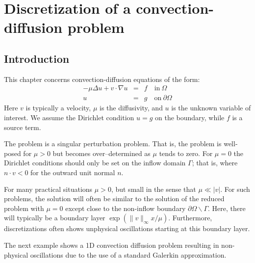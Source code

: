 \chapter{Discretization of a convection-diffusion problem}



\label{chap-conv}
\section{Introduction}
This chapter concerns convection-diffusion equations of the form: 
\begin{eqnarray*}
-\mu\Delta u + v\cdot \nabla u  &=& f \quad \textrm{in}\ \Omega\\
u&=& g \quad \textrm{on}\ \partial\Omega
\end{eqnarray*}
Here $v$ is  typically a velocity, $\mu$ is the diffusivity,  and $u$ is the 
unknown variable of interest. We assume the Dirichlet condition $u=g$ on 
the boundary, while $f$ is a source term.  

The problem is a singular perturbation problem. That is, the problem is well-posed for $\mu > 0$ but becomes over--determined as $\mu$ tends to zero. For $\mu=0$ the Dirichlet conditions should only be set on the inflow domain $\Gamma$; that is, where $n \cdot v < 0$ for the outward unit normal $n$. 

For many practical situations $\mu>0$, but small in the sense that $\mu \ll |v|$. For such problems, the solution 
will often be similar to the solution of the reduced problem with $\mu=0$ except close to the 
non-inflow boundary $\partial \Omega \backslash \Gamma$. Here, there will typically be a boundary layer $\exp{(\|v\|_\infty x / \mu)}$.      
Furthermore, discretizations often shows unphysical oscillations starting at this boundary layer.    

The next example shows a 1D convection diffusion problem resulting in non-physical oscillations due to the use
of a standard Galerkin approximation. 

